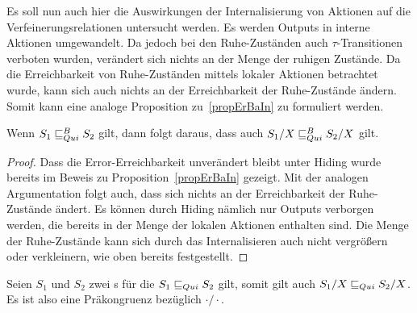 Es soll nun auch hier die Auswirkungen der Internalisierung von Aktionen auf
die Verfeinerungsrelationen untersucht werden. Es werden Outputs in interne
Aktionen umgewandelt. Da jedoch bei den Ruhe-Zuständen auch
$\tau$-Transitionen verboten wurden, verändert sich nichts an der Menge der
ruhigen Zustände. Da die Erreichbarkeit von Ruhe-Zuständen mittels lokaler
Aktionen betrachtet wurde, kann sich auch nichts an der Erreichbarkeit der
Ruhe-Zustände ändern. Somit kann eine analoge Proposition zu~\ref{propErBaIn}
zu formuliert werden.

\begin{prop}
  Wenn $S_1\sqsubseteq _{Qui}^B S_2$ gilt, dann folgt daraus, dass auch $S_1/X\sqsubseteq _{Qui}^B S_2/X$
  gilt.
\end{prop}

\begin{proof}
  Dass die Error-Erreichbarkeit unverändert bleibt unter Hiding wurde bereits
  im Beweis zu Proposition~\ref{propErBaIn} gezeigt. Mit der analogen
  Argumentation folgt auch, dass sich nichts an der Erreichbarkeit der
  Ruhe-Zustände ändert. Es können durch Hiding nämlich nur Outputs verborgen
  werden, die bereits in der Menge der lokalen Aktionen enthalten sind. Die
  Menge der Ruhe-Zustände kann sich durch das Internalisieren auch nicht
  vergrößern oder verkleinern, wie oben bereits festgestellt.
\end{proof}

\begin{satz}
  \label{satzPraeInterQui}
  Seien $S_1$ und $S_2$ zwei \EIO{}s für die $S_1\sqsubseteq _{Qui} S_2$ gilt, somit gilt
  auch $S_1/X\sqsubseteq _{Qui} S_2/X$. Es ist also \QRel{} eine Präkongruenz bezüglich
  $\cdot /\cdot$.
\end{satz}

